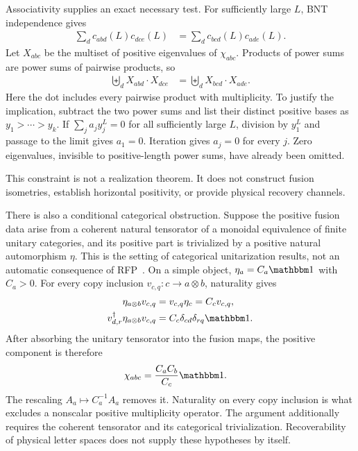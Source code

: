 Associativity supplies an exact necessary test. For sufficiently
large $L$, BNT independence gives
\begin{align}
	\sum_d c_{abd}(L)c_{dce}(L)
	 & =\sum_d c_{bcd}(L)c_{ade}(L).
	\label{eq:associativity}
\end{align}
Let $X_{abc}$ be the multiset of positive eigenvalues of
$\chi_{abc}$. Products of power sums are power sums of pairwise
products, so
\begin{align}
	\biguplus_dX_{abd}\cdot X_{dce}
	 & =\biguplus_dX_{bcd}\cdot X_{ade}.
	\label{eq:multiset}
\end{align}
Here the dot includes every pairwise product with multiplicity.
To justify the implication, subtract the two power sums and list
their distinct positive bases as $y_1>\cdots>y_k$. If
$\sum_ja_jy_j^L=0$ for all sufficiently large $L$, division by
$y_1^L$ and passage to the limit gives $a_1=0$. Iteration gives
$a_j=0$ for every $j$. Zero eigenvalues, invisible to positive-length
power sums, have already been omitted.

This constraint is not a realization theorem. It does not construct
fusion isometries, establish horizontal positivity, or provide
physical recovery channels.

There is also a conditional categorical obstruction. Suppose the
positive fusion data arise from a coherent natural tensorator of a
monoidal equivalence of finite unitary categories, and its positive
part is trivialized by a positive natural automorphism $\eta$.
This is the setting of categorical unitarization results, not an
automatic consequence of RFP~\cite{Reutter}. On a simple object,
$\eta_a=C_a\Id$ with $C_a>0$. For every copy inclusion
$v_{c,q}:c\to a\otimes b$, naturality gives
\begin{align}
	\eta_{a\otimes b}v_{c,q}
	 & =v_{c,q}\eta_c=C_cv_{c,q},     \\
	v_{d,r}^\dagger\eta_{a\otimes b}v_{c,q}
	 & =C_c\delta_{cd}\delta_{rq}\Id.
\end{align}
After absorbing the unitary tensorator into the fusion maps, the
positive component is therefore
\begin{align}
	\chi_{abc} & =\frac{C_aC_b}{C_c}\Id.
\end{align}
The rescaling $A_a\mapsto C_a^{-1}A_a$ removes it.
Naturality on every copy inclusion is what excludes a nonscalar
positive multiplicity operator. The argument additionally requires
the coherent tensorator and its categorical trivialization.
Recoverability of physical letter spaces does not supply these
hypotheses by itself.

